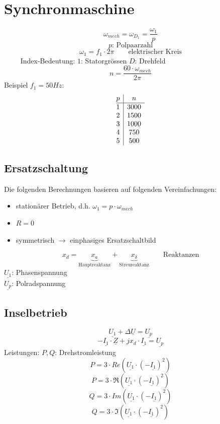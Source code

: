 \section{Synchronmaschine}
\[ \omega_{mech} = \omega_{D_1} = \frac{\omega_1}{p} \]
\[ p\text{: Polpaarzahl} \]
\[ \omega_1 = f_1 \cdot 2 \pi \qquad \text{elektrischer Kreis} \]
$\qquad$ Index-Bedeutung: $1$: Statorgrössen $D$: Drehfeld
\[ n = \frac{60 \cdot \omega_{mech}}{2 \pi} \]
Beispiel $f_1 = 50 Hz$: 
\[ \begin{array}{@{}c|c}
p & n    \\
\hline
1 & 3000 \\
2 & 1500 \\
3 & 1000 \\
4 & 750  \\
5 & 500  \\
\end{array} \]

\subsection{Ersatzschaltung}
Die folgenden Berechnungen basieren auf folgenden Vereinfachungen: 
\begin{itemize}
  \item stationärer Betrieb, d.h. $\omega_1 = p \cdot \omega_{mech}$
  \item $R = 0$
  \item symmetrisch $\rightarrow$ einphasiges Ersatzschaltbild
\end{itemize}
\[ x_d = \underbrace{x_a}_{\text{Hauptreaktanz}} + \underbrace{x_{\delta}}
_{\text{Streureaktanz}}\qquad \text{Reaktanzen} \]
$\underline{U_1}$: Phasenspannung \\
$\underline{U_p}$: Polradspannung

\subsection{Inselbetrieb}
\[ \underline{U_1} + \Delta \underline{U} = \underline{U_p} \]
\[ -\underline{I_1} \cdot \underline{Z} + j x_d \cdot \underline{I_1} 
= \underline{U_p} \]
Leistungen: $P, Q$: Drehstromleistung
\[ P = 3 \cdot Re(\underline{U_1} \cdot (-\underline{I_1})^2) \]
\[ P = 3 \cdot \Re(\underline{U_1} \cdot (-\underline{I_1})^2) \]
\[ Q = 3 \cdot Im(\underline{U_1} \cdot (-\underline{I_1})^2) \]
\[ Q = 3 \cdot \Im(\underline{U_1} \cdot (-\underline{I_1})^2) \]

